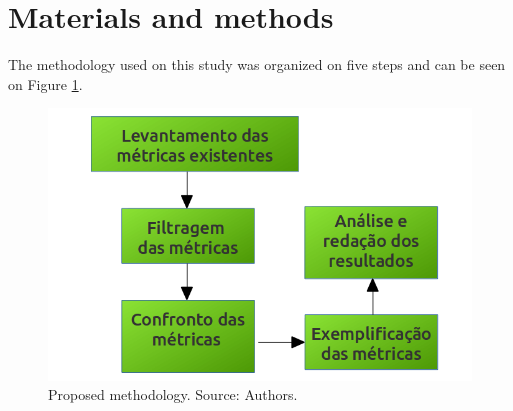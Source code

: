 \documentclass[conference]{IEEEtran}
\begin{document}
\section{Materials and methods}

The methodology used on this study was organized on five steps and can be seen on Figure \ref{metodologia}.

\begin{figure}[ht]
  \centering
  \includegraphics[width=.3\textwidth]{figuras/metodologia.png}
  \caption{Proposed methodology. Source: Authors.}
  \label{metodologia}
\end{figure}
\end{document}
